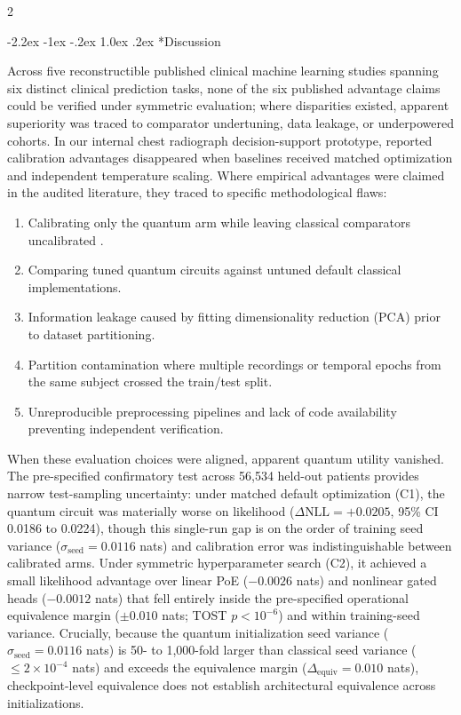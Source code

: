 \documentclass[10pt,a4paper,twoside]{article}
\makeatletter
\renewcommand{\section}{\@startsection{section}{1}{\z@}%
  {-2.2ex \@plus -1ex \@minus -.2ex}%
  {1.0ex \@plus.2ex}%
  {\normalfont\large\sffamily\bfseries\color{naturedark}}}
\makeatother
\begin{document}
\begin{multicols}{2}

\section*{Discussion}

Across five reconstructible published clinical machine learning studies spanning six distinct clinical prediction tasks, none of the six published advantage claims could be verified under symmetric evaluation; where disparities existed, apparent superiority was traced to comparator undertuning, data leakage, or underpowered cohorts. In our internal chest radiograph decision-support prototype, reported calibration advantages disappeared when baselines received matched optimization and independent temperature scaling. Where empirical advantages were claimed in the audited literature, they traced to specific methodological flaws:
\begin{enumerate}
  \setlength{\itemsep}{1pt}
  \setlength{\parskip}{0pt}
  \item Calibrating only the quantum arm while leaving classical comparators uncalibrated \cite{guo2017}.
  \item Comparing tuned quantum circuits against untuned default classical implementations.
  \item Information leakage caused by fitting dimensionality reduction (PCA) prior to dataset partitioning.
  \item Partition contamination where multiple recordings or temporal epochs from the same subject crossed the train/test split.
  \item Unreproducible preprocessing pipelines and lack of code availability preventing independent verification.
\end{enumerate}

When these evaluation choices were aligned, apparent quantum utility vanished. The pre-specified confirmatory test across 56,534 held-out patients provides narrow test-sampling uncertainty: under matched default optimization (C1), the quantum circuit was materially worse on likelihood ($\Delta\text{NLL} = +0.0205$, 95\% CI 0.0186 to 0.0224), though this single-run gap is on the order of training seed variance ($\sigma_{\text{seed}} = 0.0116$ nats) and calibration error was indistinguishable between calibrated arms. Under symmetric hyperparameter search (C2), it achieved a small likelihood advantage over linear PoE ($-0.0026$ nats) and nonlinear gated heads ($-0.0012$ nats) that fell entirely inside the pre-specified operational equivalence margin ($\pm 0.010$ nats; TOST $p < 10^{-6}$) and within training-seed variance. Crucially, because the quantum initialization seed variance ($\sigma_{\text{seed}} = 0.0116$ nats) is 50- to 1,000-fold larger than classical seed variance ($\le 2 \times 10^{-4}$ nats) and exceeds the equivalence margin ($\Delta_{\text{equiv}} = 0.010$ nats), checkpoint-level equivalence does not establish architectural equivalence across initializations.


\end{multicols}
\end{document}
